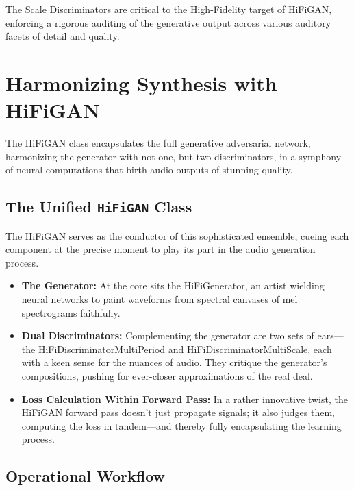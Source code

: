 \documentclass[a4paper]{article}
\begin{document}
The Scale Discriminators are critical to the High-Fidelity target of HiFiGAN, enforcing a rigorous auditing of the generative output across various auditory facets of detail and quality.



\section{Harmonizing Synthesis with HiFiGAN}

The HiFiGAN class encapsulates the full generative adversarial network, harmonizing the generator with not one, but two discriminators, in a symphony of neural computations that birth audio outputs of stunning quality.

\subsection{The Unified \texttt{HiFiGAN} Class}

The HiFiGAN serves as the conductor of this sophisticated ensemble, cueing each component at the precise moment to play its part in the audio generation process.

\begin{itemize}
  \item \textbf{The Generator:} At the core sits the HiFiGenerator, an artist wielding neural networks to paint waveforms from spectral canvases of mel spectrograms faithfully.
  
  \item \textbf{Dual Discriminators:} Complementing the generator are two sets of ears—the HiFiDiscriminatorMultiPeriod and HiFiDiscriminatorMultiScale, each with a keen sense for the nuances of audio. They critique the generator's compositions, pushing for ever-closer approximations of the real deal.
  
  \item \textbf{Loss Calculation Within Forward Pass:} In a rather innovative twist, the HiFiGAN forward pass doesn't just propagate signals; it also judges them, computing the loss in tandem—and thereby fully encapsulating the learning process.
\end{itemize}

\subsection{Operational Workflow}
\end{document}
